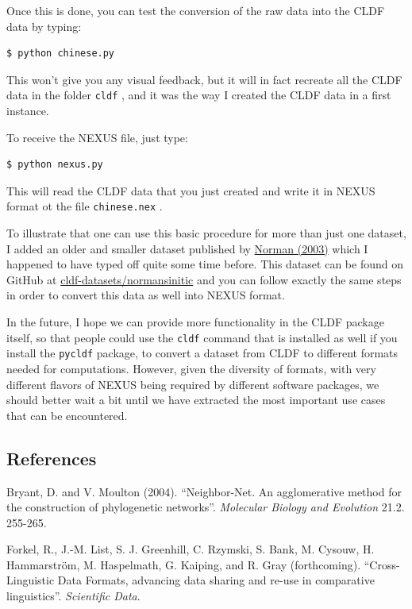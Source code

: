 \documentclass[
  a4paper,
  14pt,
  oneside,
  tablecaptionabove
]{scrbook}
\begin{document}
Once this is done, you can test the conversion of the raw data into the
CLDF data by typing:

\begin{lstlisting}
$ python chinese.py
\end{lstlisting}

This won't give you any visual feedback, but it will in fact recreate
all the CLDF data in the folder \lstinline!cldf! , and it was the way I
created the CLDF data in a first instance.

To receive the NEXUS file, just type:

\begin{lstlisting}
$ python nexus.py
\end{lstlisting}

This will read the CLDF data that you just created and write it in NEXUS
format ot the file \lstinline!chinese.nex! .

To illustrate that one can use this basic procedure for more than just
one dataset, I added an older and smaller dataset published by
\href{http://bibliography.lingpy.org?key=Normal2003}{Norman (2003)}
which I happened to have typed off quite some time before. This dataset
can be found on GitHub at
\href{https://github.com/cldf-datasets/normansinitic}{cldf-datasets/normansinitic}
and you can follow exactly the same steps in order to convert this data
as well into NEXUS format.

In the future, I hope we can provide more functionality in the CLDF
package itself, so that people could use the \lstinline!cldf! command
that is installed as well if you install the \lstinline!pycldf! package,
to convert a dataset from CLDF to different formats needed for
computations. However, given the diversity of formats, with very
different flavors of NEXUS being required by different software
packages, we should better wait a bit until we have extracted the most
important use cases that can be encountered.

\subsection*{References}

\nopagebreak\hangindent=0.7cm {\small Bryant, D. and V. Moulton (2004). ``Neighbor-Net. An
agglomerative method for the construction of phylogenetic networks''. 
\emph{Molecular Biology and Evolution} 21.2. 255-265. }

\nopagebreak\hangindent=0.7cm {\small Forkel, R., J.-M. List, S. J. Greenhill, C. Rzymski, S. Bank, M. Cysouw,
H. Hammarström, M. Haspelmath, G. Kaiping, and R. Gray (forthcoming).
``Cross-Linguistic Data Formats, advancing data sharing and re-use
in comparative linguistics''.  \emph{Scientific Data}. }
\end{document}
